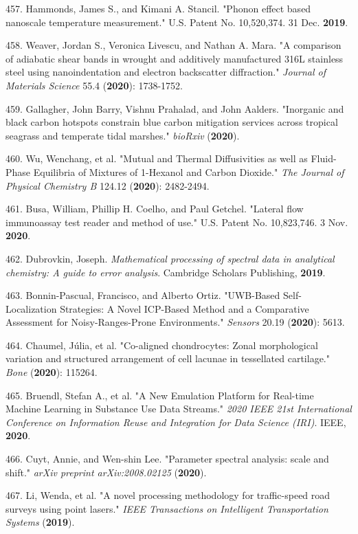 457. Hammonds, James S., and Kimani A. Stancil. "Phonon effect based nanoscale temperature measurement." U.S. Patent No. 10,520,374. 31 Dec. \textbf{2019}.

458. Weaver, Jordan S., Veronica Livescu, and Nathan A. Mara. "A comparison of adiabatic shear bands in wrought and additively manufactured 316L stainless steel using nanoindentation and electron backscatter diffraction." \textit{Journal of Materials Science} 55.4 (\textbf{2020}): 1738-1752.

459. Gallagher, John Barry, Vishnu Prahalad, and John Aalders. "Inorganic and black carbon hotspots constrain blue carbon mitigation services across tropical seagrass and temperate tidal marshes." \textit{bioRxiv} (\textbf{2020}).

460. Wu, Wenchang, et al. "Mutual and Thermal Diffusivities as well as Fluid-Phase Equilibria of Mixtures of 1-Hexanol and Carbon Dioxide." \textit{The Journal of Physical Chemistry B} 124.12 (\textbf{2020}): 2482-2494.

461. Busa, William, Phillip H. Coelho, and Paul Getchel. "Lateral flow immunoassay test reader and method of use." U.S. Patent No. 10,823,746. 3 Nov. \textbf{2020}.

462. Dubrovkin, Joseph. \textit{Mathematical processing of spectral data in analytical chemistry: A guide to error analysis}. Cambridge Scholars Publishing, \textbf{2019}.

463. Bonnin-Pascual, Francisco, and Alberto Ortiz. "UWB-Based Self-Localization Strategies: A Novel ICP-Based Method and a Comparative Assessment for Noisy-Ranges-Prone Environments." \textit{Sensors} 20.19 (\textbf{2020}): 5613.

464. Chaumel, J\'{u}lia, et al. "Co-aligned chondrocytes: Zonal morphological variation and structured arrangement of cell lacunae in tessellated cartilage." \textit{Bone} (\textbf{2020}): 115264.

465. Bruendl, Stefan A., et al. "A New Emulation Platform for Real-time Machine Learning in Substance Use Data Streams." \textit{2020 IEEE 21st International Conference on Information Reuse and Integration for Data Science (IRI)}. IEEE, \textbf{2020}.

466. Cuyt, Annie, and Wen-shin Lee. "Parameter spectral analysis: scale and shift." \textit{arXiv preprint arXiv:2008.02125} (\textbf{2020}).

467. Li, Wenda, et al. "A novel processing methodology for traffic-speed road surveys using point lasers." \textit{IEEE Transactions on Intelligent Transportation Systems} (\textbf{2019}).

